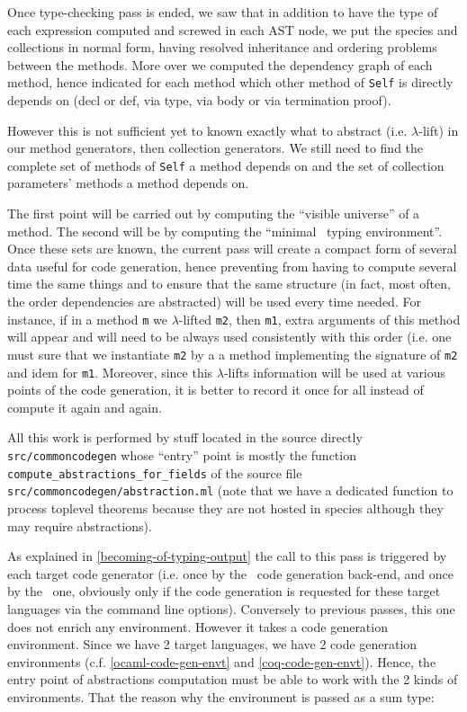 \label{intermediate-abstractions}
Once type-checking pass is ended, we saw that in addition to have the
type of each expression computed and screwed in each AST node, we put
the species and collections in normal form, having resolved
inheritance and ordering problems between the methods. More over we
computed the dependency graph of each method, hence indicated for each
method which other method of {\tt Self} is directly depends on (decl
or def, via type, via body or via termination proof).

However this is not sufficient yet to known exactly what to abstract
(i.e. $\lambda$-lift) in our method generators, then collection
generators. We still need to find the complete set of methods of
{\tt Self} a method depends on and the set of collection parameters'
methods a method depends on.

The first point will be carried out by computing the ``visible
universe'' of a method. The second will be by computing the ``minimal
\coq\ typing environment''. Once these sets are known, the current
pass will create a compact form of several data useful for code
generation, hence preventing from having to compute several time the
same things and to ensure that the same structure (in fact, most
often, the order dependencies are abstracted) will be used every time
needed. For instance, if in a method {\tt m} we $\lambda$-lifted
{\tt m2}, then {\tt m1}, extra arguments of this method will appear
and will need to be always used consistently with this order (i.e. one
must sure that we instantiate {\tt m2} by a a method implementing the
signature of {\tt m2} and idem for {\tt m1}. Moreover, since this
$\lambda$-lifts information will be used at various points of the code
generation, it is better to record it once for all instead of compute
it again and again.

All this work is performed by stuff located in the source directly
{\tt src/commoncodegen} whose ``entry'' point is mostly the function
{\tt compute\_abstractions\_for\_fields} of the source file
{\tt src/commoncodegen/abstraction.ml} (note that we have a dedicated
function to process toplevel theorems because they are not hosted in
species although they may require abstractions).

As explained in \ref{becoming-of-typing-output} the call to this pass
is triggered by each target code generator (i.e. once by the
\ocaml\ code generation back-end, and once by the \coq\ one, obviously
only if the code generation is requested for these target languages
via the command line options). Conversely to previous passes, this one
does not enrich any environment. However it takes a code generation
environment. Since we have 2 target languages, we have 2 code
generation environments (c.f. \ref{ocaml-code-gen-envt} and
\ref{coq-code-gen-envt}). Hence, the entry point of abstractions
computation must be able to work with the 2 kinds of
environments. That the reason why the environment is passed as a sum
type:

